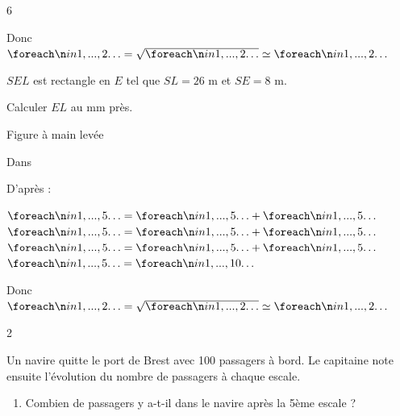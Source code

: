 \documentclass[a4paper]{book}
\begin{document}
{\begin{exerciceNote}{6}
\begin{minipage}{0.5\linewidth}
            \medskip
    
            Donc $\points[2]=\sqrt{\points[2]}\simeq\points[2]$
        \end{minipage}
        \vline
        \hfill
        \begin{minipage}{0.49\linewidth}
             $SEL$ est rectangle en $E$ tel que $SL = 26$ m et $SE = 8$ m. 
    
            Calculer $EL$ au mm près.
    
            \begin{center}
                \small{Figure à main levée}
                
            \end{center}
                
            Dans \points[18]
    
            \medskip
    
            D'après \points[15] :
    
            \medskip
    
            $\points[5] = \points[5]+\points[5]$ \\
            $\points[5] = \points[5]+\points[5]$ \\
            $\points[5] = \points[5]+\points[5]$ \\
            $\points[5] = \points[10]$ 
    
            \medskip
    
            Donc $\points[2]=\sqrt{\points[2]}\simeq\points[2]$
        \end{minipage}
    \end{exerciceNote}


    \begin{exerciceNote}{2}
        \begin{minipage}{0.7\linewidth}
            Un navire quitte le port de Brest avec 100 passagers à bord. Le capitaine note ensuite l'évolution du nombre de passagers à chaque escale.

            \begin{enumerate}
                \item Combien de passagers y a-t-il dans le navire après la 5ème escale ?

                \points[48]


\end{enumerate}
\end{minipage}
\end{exerciceNote}}
\end{document}
